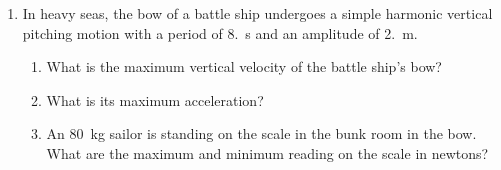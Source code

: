 \documentclass{../../../oss-apphys}
\begin{document}
\begin{enumerate}[leftmargin=15pt]

%  

\item In heavy seas, the bow of a battle ship undergoes a simple harmonic
  vertical pitching motion with a period of \SI{8.}{\second} and an amplitude
  of \SI{2.}{\metre}.
  \begin{enumerate}[itemsep=.8in,topsep=0pt,leftmargin=15pt]
  \item What is the maximum vertical velocity of the battle ship's bow?
  \item What is its maximum acceleration?
  \item An \SI{80}{\kilo\gram} sailor is standing on the scale in the bunk room
    in the bow. What are the maximum and minimum reading on the scale in
    newtons?
    \vspace{.8in}
  \end{enumerate}


\end{enumerate}
\end{document}

